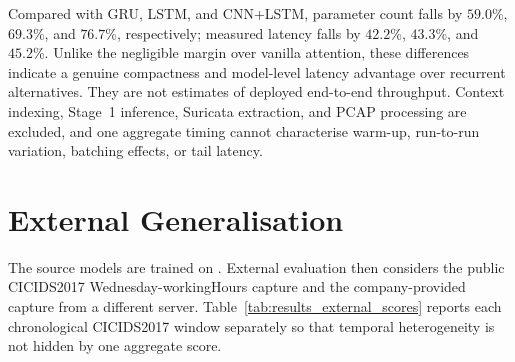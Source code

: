 \documentclass[11pt,fleqn]{report}
\begin{document}
Compared with GRU, LSTM, and CNN+LSTM, parameter count falls by $59.0\%$, $69.3\%$, and $76.7\%$, respectively; measured latency falls by $42.2\%$, $43.3\%$, and $45.2\%$. Unlike the negligible margin over vanilla attention, these differences indicate a genuine compactness and model-level latency advantage over recurrent alternatives. They are not estimates of deployed end-to-end throughput. Context indexing, Stage~1 inference, Suricata extraction, and PCAP processing are excluded, and one aggregate timing cannot characterise warm-up, run-to-run variation, batching effects, or tail latency.

\section{External Generalisation}
\label{subsec:results_external_generalisation}

The source models are trained on . External evaluation then considers the public CICIDS2017 Wednesday-workingHours capture and the company-provided  capture from a different server. Table~\ref{tab:results_external_scores} reports each chronological CICIDS2017 window separately so that temporal heterogeneity is not hidden by one aggregate score.

\begin{table}[H]
    \centering
    \caption{External evaluation on prevalence-compatible public CICIDS2017 Wednesday windows and a separate company server capture.}
    \label{tab:results_external_scores}
\end{table}
\end{document}
